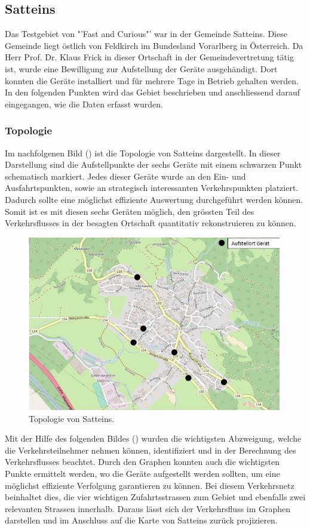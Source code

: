 \subsection{Satteins}
Das Testgebiet von "'Fast and Curious"' war in der Gemeinde Satteins. Diese Gemeinde liegt östlich von Feldkirch im Bundesland Vorarlberg in Österreich. Da Herr Prof. Dr. Klaus Frick in dieser Ortschaft in der Gemeindevertretung tätig ist, wurde eine Bewilligung zur Aufstellung der Geräte ausgehändigt. Dort konnten die Geräte installiert und für mehrere Tage in Betrieb gehalten werden. In den folgenden Punkten wird das Gebiet beschrieben und anschliessend darauf eingegangen, wie die Daten erfasst wurden.

\subsubsection{Topologie}
Im nachfolgenen Bild () ist die Topologie von Satteins dargestellt. In dieser Darstellung sind die Aufstellpunkte der sechs Geräte mit einem schwarzen Punkt schematisch markiert. Jedes dieser Geräte wurde an den Ein- und Ausfahrtspunkten, sowie an strategisch interessanten Verkehrspunkten platziert. Dadurch sollte eine möglichst effiziente Auswertung durchgeführt werden können. Somit ist es mit diesen sechs Geräten möglich, den grössten Teil des Verkehrsflusses in der besagten Ortschaft quantitativ rekonstruieren zu können. 

\begin{figure}[H]
  \centering
  \includegraphics[width=0.99\textwidth]{Resultate/Satteins.jpg} 
  \caption{Topologie von Satteins. \cite{satteins}}
  \label{bSatteins}
\end{figure}
\newpage
Mit der Hilfe des folgenden Bildes () wurden die wichtigsten Abzweigung, welche die Verkehrsteilnehmer nehmen können, identifiziert und in der Berechnung des Verkehrsflusses beachtet. Durch den Graphen konnten auch die wichtigsten Punkte ermittelt werden, wo die Geräte aufgestellt werden sollten, um eine möglichst effiziente Verfolgung garantieren zu können. Bei diesem Verkehrsnetz beinhaltet dies, die vier wichtigen Zufahrtsstrassen zum Gebiet und ebenfalls zwei relevanten Strassen innerhalb. Daraus lässt sich der Verkehrsfluss im Graphen darstellen und im Anschluss auf die Karte von Satteins zurück projizieren.

